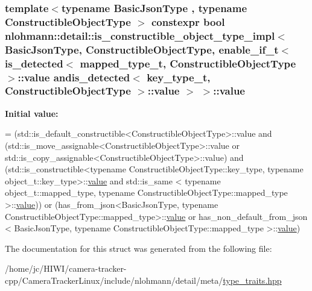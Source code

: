 \subsubsection[{\texorpdfstring{value}{value}}]{\setlength{\rightskip}{0pt plus 5cm}template$<$typename Basic\+Json\+Type , typename Constructible\+Object\+Type $>$ constexpr bool {\bf nlohmann\+::detail\+::is\+\_\+constructible\+\_\+object\+\_\+type\+\_\+impl}$<$ Basic\+Json\+Type, Constructible\+Object\+Type, {\bf enable\+\_\+if\+\_\+t}$<$ {\bf is\+\_\+detected}$<$ {\bf mapped\+\_\+type\+\_\+t}, Constructible\+Object\+Type $>$\+::value andis\+\_\+detected$<$ {\bf key\+\_\+type\+\_\+t}, Constructible\+Object\+Type $>$\+::value $>$ $>$\+::value\hspace{0.3cm}{\ttfamily [static]}}\hypertarget{structnlohmann_1_1detail_1_1is__constructible__object__type__impl_3_01_basic_json_type_00_01_con54f4e42d1833d70d2e8917d37429aa30_a537ae1ad3342deee914042a040d86735}{}\label{structnlohmann_1_1detail_1_1is__constructible__object__type__impl_3_01_basic_json_type_00_01_con54f4e42d1833d70d2e8917d37429aa30_a537ae1ad3342deee914042a040d86735}
{\bfseries Initial value\+:}
\begin{DoxyCode}
=
        (std::is\_default\_constructible<ConstructibleObjectType>::value and
         (std::is\_move\_assignable<ConstructibleObjectType>::value or
          std::is\_copy\_assignable<ConstructibleObjectType>::value) and
         (std::is\_constructible<\textcolor{keyword}{typename} ConstructibleObjectType::key\_type,
          \textcolor{keyword}{typename} object\_t::key\_type>::\hyperlink{structnlohmann_1_1detail_1_1is__constructible__object__type__impl_3_01_basic_json_type_00_01_con54f4e42d1833d70d2e8917d37429aa30_a537ae1ad3342deee914042a040d86735}{value} and
          std::is\_same <
          \textcolor{keyword}{typename} object\_t::mapped\_type,
          \textcolor{keyword}{typename} ConstructibleObjectType::mapped\_type >::\hyperlink{structnlohmann_1_1detail_1_1is__constructible__object__type__impl_3_01_basic_json_type_00_01_con54f4e42d1833d70d2e8917d37429aa30_a537ae1ad3342deee914042a040d86735}{value})) or
        (has\_from\_json<BasicJsonType,
         \textcolor{keyword}{typename} ConstructibleObjectType::mapped\_type>::\hyperlink{structnlohmann_1_1detail_1_1is__constructible__object__type__impl_3_01_basic_json_type_00_01_con54f4e42d1833d70d2e8917d37429aa30_a537ae1ad3342deee914042a040d86735}{value} or
         has\_non\_default\_from\_json <
         BasicJsonType,
         \textcolor{keyword}{typename} ConstructibleObjectType::mapped\_type >::\hyperlink{structnlohmann_1_1detail_1_1is__constructible__object__type__impl_3_01_basic_json_type_00_01_con54f4e42d1833d70d2e8917d37429aa30_a537ae1ad3342deee914042a040d86735}{value})
\end{DoxyCode}


The documentation for this struct was generated from the following file\+:\begin{DoxyCompactItemize}
\item 
/home/jc/\+H\+I\+W\+I/camera-\/tracker-\/cpp/\+Camera\+Tracker\+Linux/include/nlohmann/detail/meta/\hyperlink{type__traits_8hpp}{type\+\_\+traits.\+hpp}\end{DoxyCompactItemize}
